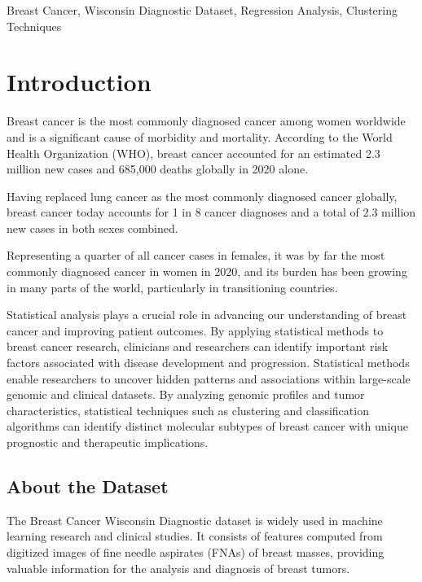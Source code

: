 \documentclass[conference]{IEEEtran}
\begin{document}
\begin{IEEEkeywords}
Breast Cancer, Wisconsin Diagnostic Dataset, Regression Analysis, Clustering Techniques
\end{IEEEkeywords}




\vspace{0.1cm}
\section{Introduction}
Breast cancer is the most commonly diagnosed cancer among women worldwide and is a significant cause of morbidity and mortality. According to the World Health Organization (WHO), breast cancer accounted for an estimated 2.3 million new cases and 685,000 deaths globally in 2020 alone\cite{arnold2022current}.

Having replaced lung cancer as the most commonly diagnosed cancer globally, breast cancer today accounts for 1 in 8 cancer diagnoses and a total of 2.3 million new cases in both sexes combined\cite{sung2021global}.

Representing a quarter of all cancer cases in females, it was by far the most commonly diagnosed cancer in women in 2020, and its burden has been growing in many parts of the world, particularly in transitioning countries\cite{arnold2022current, heer2020global}.

Statistical analysis plays a crucial role in advancing our understanding of breast cancer and improving patient outcomes. By applying statistical methods to breast cancer research, clinicians and researchers can identify important risk factors associated with disease development and progression.
Statistical methods enable researchers to uncover hidden patterns and associations within large-scale genomic and clinical datasets. By analyzing genomic profiles and tumor characteristics, statistical techniques such as clustering and classification algorithms can identify distinct molecular subtypes of breast cancer with unique prognostic and therapeutic implications\cite{curtis2012genomic}.

\subsection{About the Dataset}

The Breast Cancer Wisconsin Diagnostic dataset is widely used in machine learning research and clinical studies. It consists of features computed from digitized images of fine needle aspirates (FNAs) of breast masses, providing valuable information for the analysis and diagnosis of breast tumors.
\end{document}

